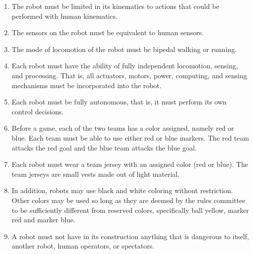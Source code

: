 \documentclass[12pt]{article}
\newcounter{law}[section]
\newenvironment{lawlist}[1][Law]{ %
  \begin{enumerate} %
    \renewcommand{\theenumi}{#1-\arabic{law}.\arabic{enumi}}} %
  {\end{enumerate}}
\begin{document}
\begin{lawlist}
  \begin{itemize}
    \item \emph{Small robots} are limited to a maximum height of 50cm
       and a maximum foot dimension of 14cm.
    \item \emph{Large robots} must have a height of more than 80cm and
    are limited to a maximum height of 150cm and a maximum foot
    dimension of 35cm.  
  \end{itemize}

\item \label{kinematics} The robot must be limited in its kinematics
to actions that could be performed with human kinematics.

\item \label{sensing} The sensors on the robot must be equivalent to
human sensors. 

\item \label{walking} The mode of locomotion of the robot must be
bipedal walking or running. 

\item \label{autonomous} Each robot must have the ability of fully
  independent locomotion, sensing, and processing. That is, all
  actuators, motors, power, computing, and sensing mechanisms must be
  incorporated into the robot.

\item \label{autonomous2} Each robot must be fully autonomous, that
  is, it must perform its own control decisions.

\item Before a game, each of the two teams has a color assigned,
  namely red or blue. Each team must be able to use either red
  or blue markers. The red team attacks the red goal and the
  blue team attacks the blue goal. 

\item Each robot must wear a team jersey with an assigned color
(red or blue). The team jerseys are small vests made out of light
material.

\item In addition, robots may use black and white coloring without
  restriction. Other colors may be used so long as they are deemed by
  the rules committee to be sufficiently different from reserved
  colors, specifically ball yellow, marker red and
  marker blue.

\item A robot must not have in its construction anything that is
  dangerous to itself, another robot, human operators, or spectators.


\end{lawlist}
\end{document}
